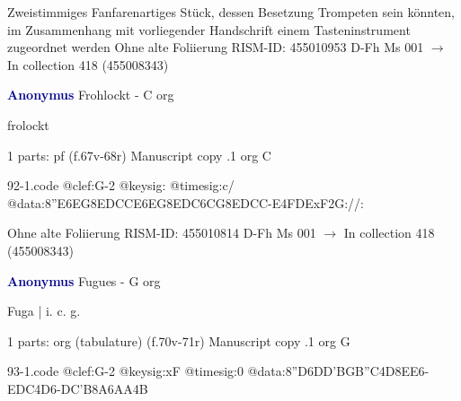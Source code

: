 \documentclass[twocolumn]{book}
\begin{document}
\newline Zweistimmiges Fanfarenartiges Stück, dessen Besetzung Trompeten sein könnten, im Zusammenhang mit vorliegender Handschrift einem Tasteninstrument zugeordnet werden
\newline Ohne alte Foliierung
\newline RISM-ID: 455010953
\newline D-Fh  Ms 001
\newline $\rightarrow$ In collection 418 (455008343)
      
\newline \par \vspace{7pt} \textcolor{darkblue}{\textbf{Anonymus  }}
\newline Frohlockt - C
\newline org
\newline \begin{itshape}[f.67v, at left:] frolockt\end{itshape} 
\newline \textcolor{darkblue}{}  1 parts: pf  (f.67v-68r)
\newline Manuscript copy
.1  org  C  
\begin{filecontents*}{92-1.code}
@clef:G-2
@keysig:
@timesig:c/
@data:{8''E6EG8ED}{CC}{E6EG8ED}{C6CG8ED}{CC}-E4FDExF2G://:
\end{filecontents*}
\newline
%

\newline Ohne alte Foliierung
\newline RISM-ID: 455010814
\newline D-Fh  Ms 001
\newline $\rightarrow$ In collection 418 (455008343)
      
\newline \par \vspace{7pt} \textcolor{darkblue}{\textbf{Anonymus  }}
\newline Fugues - G
\newline org
\newline \begin{itshape}[f.70v, at left:] Fuga | i. c. g.\end{itshape} 
\newline \textcolor{darkblue}{}  1 parts: org (tabulature)  (f.70v-71r)
\newline Manuscript copy
.1  org  G  
\begin{filecontents*}{93-1.code}
@clef:G-2
@keysig:xF
@timesig:0
@data:{8''D6DD}{'BGB''C}4D{8EE}6-{EDC}4D6-{DC'B}{8A6AA}4B
\end{filecontents*}
\newline
%
\end{document}
